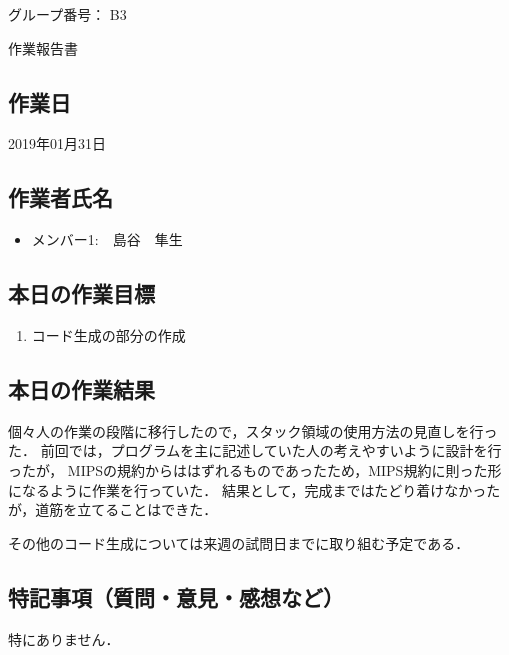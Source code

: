 \documentclass[a4j]{jarticle}
\begin{document}
\thispagestyle{empty}

\begin{flushright}
グループ番号： B3
\end{flushright}

\begin{center}
{\LARGE 作業報告書}
\end{center}

\subsection*{作業日}

2019年01月31日


\subsection*{作業者氏名}

\begin{itemize}
  \item メンバー1:　島谷　隼生

\end{itemize}

\subsection*{本日の作業目標}

\begin{enumerate}
\item
コード生成の部分の作成


\end{enumerate}

\subsection*{本日の作業結果}

個々人の作業の段階に移行したので，スタック領域の使用方法の見直しを行った．
前回では，プログラムを主に記述していた人の考えやすいように設計を行ったが，
MIPSの規約からははずれるものであったため，MIPS規約に則った形になるように作業を行っていた．
結果として，完成まではたどり着けなかったが，道筋を立てることはできた．

その他のコード生成については来週の試問日までに取り組む予定である．

\subsection*{特記事項（質問・意見・感想など）}

特にありません．
\end{document}
